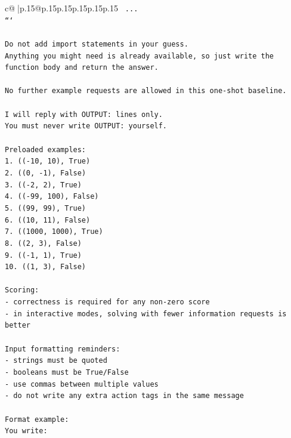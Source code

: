 \documentclass{article}
\begin{document}
{\begin{supertabular}{c@{$\;$}|p{.15\linewidth}@{}p{.15\linewidth}p{.15\linewidth}p{.15\linewidth}p{.15\linewidth}p{.15\linewidth}}
{{{\texttt{    ...} \\
\texttt{```} \\
\\ 
\texttt{Do not add import statements in your guess.} \\
\texttt{Anything you might need is already available, so just write the function body and return the answer.} \\
\\ 
\texttt{No further example requests are allowed in this one{-}shot baseline.} \\
\\ 
\texttt{I will reply with OUTPUT: lines only.} \\
\texttt{You must never write OUTPUT: yourself.} \\
\\ 
\texttt{Preloaded examples:} \\
\texttt{1. (({-}10, 10), True)} \\
\texttt{2. ((0, {-}1), False)} \\
\texttt{3. (({-}2, 2), True)} \\
\texttt{4. (({-}99, 100), False)} \\
\texttt{5. ((99, 99), True)} \\
\texttt{6. ((10, 11), False)} \\
\texttt{7. ((1000, 1000), True)} \\
\texttt{8. ((2, 3), False)} \\
\texttt{9. (({-}1, 1), True)} \\
\texttt{10. ((1, 3), False)} \\
\\ 
\texttt{Scoring:} \\
\texttt{{-} correctness is required for any non{-}zero score} \\
\texttt{{-} in interactive modes, solving with fewer information requests is better} \\
\\ 
\texttt{Input formatting reminders:} \\
\texttt{{-} strings must be quoted} \\
\texttt{{-} booleans must be True/False} \\
\texttt{{-} use commas between multiple values} \\
\texttt{{-} do not write any extra action tags in the same message} \\
\\ 
\texttt{Format example:} \\
\texttt{You write:} \\
}}}
\end{supertabular}}
\end{document}
